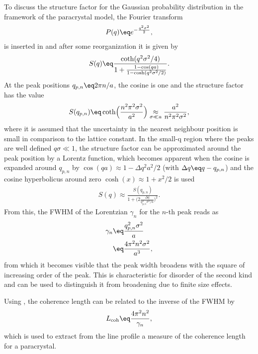 \documentclass[\main/dresen_thesis.tex]{subfiles}
\begin{document}
To discuss the structure factor for the Gaussian probability distribution in the framework of the paracrystal model, the Fourier transform
\begin{align}
  P(q) \eq e^{-\frac{q^2 \sigma^2}{2}},
\end{align}
is inserted in  and after some reorganization it is given by
\begin{align}
  S(q) \eq \frac{\coth(q^2 \sigma^2/4)}{1 + \frac{1 - \cos(qa)}{1 - \cosh(q^2 \sigma^2/2)}}.
\end{align}
At the peak positions $q_{p, n} \eq 2 \pi n/a$, the cosine is one and the structure factor has the value
\begin{align}
  S(q_{p, n}) \eq \coth \Bigl( \frac{n^2 \pi^2 \sigma^2}{a^2} \Bigr) \underset{\sigma \ll a}{\approx} \frac{a^2}{n^2 \pi^2 \sigma^2},
\end{align}
where it is assumed that the uncertainty in the nearest neighbour position is small in comparison to the lattice constant.
In the small-q region where the peaks are well defined $q \sigma \ll 1$, the structure factor can be approximated around the peak position by a Lorentz function, which becomes apparent when the cosine is expanded around $q_{p, n}$ by $\cos(qa) \approx 1 - \Delta q^2 a^2 /2$ (with $\Delta q \eq q - q_{p, n}$) and the cosine hyperbolicus around zero $\cosh(x) \approx 1 + x^2/2$ is used
\begin{align}
  S(q) \approx \frac{S(q_{p, n})}{1 + \biggl(2\frac{\Delta q}{q_{p,n}^2 \sigma^2/a} \biggr)^2}.
\end{align}
From this, the FWHM of the Lorentzian $\gamma_n$ for the $n$-th peak reads as
\begin{align}\begin{split}
  \gamma_n \eq& \frac{q_{p,n}^2 \sigma^2}{a}\\
  \eq& \frac{4 \pi^2 n^2 \sigma^2}{a^3},
\end{split}\end{align}
from which it becomes visible that the peak width broadens with the square of increasing order of the peak.
This is characteristic for disorder of the second kind and can be used to distinguish it from broadening due to finite size effects.

Using , the coherence length can be related to the inverse of the FWHM by
\begin{align}
  L_\mathrm{coh} \eq \frac{4 \pi^2 n^2}{\gamma_n},\label{eq:appendix:calculations:paracrystal:CoherenceFWHMEquation}
\end{align}
which is used to extract from the line profile a measure of the coherence length for a paracrystal.
\end{document}
